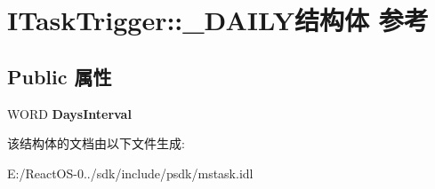 \hypertarget{struct_i_task_trigger_1_1___d_a_i_l_y}{}\section{I\+Task\+Trigger\+:\+:\+\_\+\+D\+A\+I\+L\+Y结构体 参考}
\label{struct_i_task_trigger_1_1___d_a_i_l_y}
\subsection*{Public 属性}
\begin{DoxyCompactItemize}
\item 
\mbox{\label{struct_i_task_trigger_1_1___d_a_i_l_y_adc4821c1cd11de7cdf086105dfb45739}} 
W\+O\+RD {\bfseries Days\+Interval}
\end{DoxyCompactItemize}


该结构体的文档由以下文件生成\+:\begin{DoxyCompactItemize}
\item 
E\+:/\+React\+O\+S-\/0../sdk/include/psdk/mstask.\+idl\end{DoxyCompactItemize}
